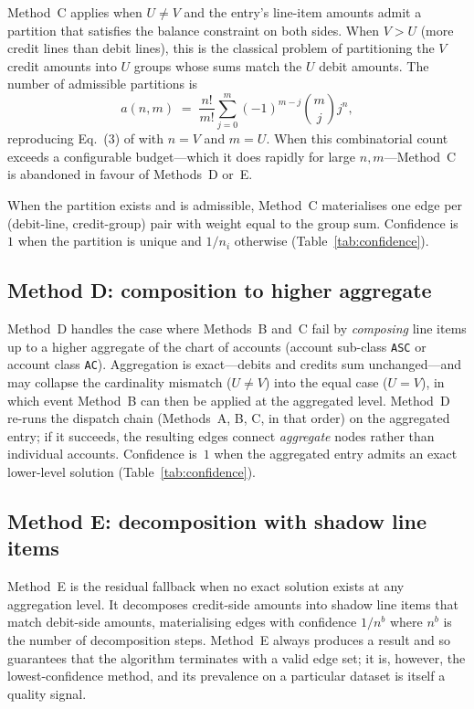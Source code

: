 Method~C applies when $U \neq V$ and the entry's line-item amounts
admit a partition that satisfies the balance constraint
on both sides.  When $V > U$ (more credit lines than debit
lines), this is the classical problem of partitioning the $V$
credit amounts into $U$ groups whose sums match the $U$ debit
amounts.  The number of admissible partitions is
\begin{equation}
  a(n, m) \;=\; \frac{n!}{m!} \sum_{j=0}^{m}
                (-1)^{m-j} \binom{m}{j} j^n, \label{eq:partition-count}
\end{equation}
reproducing Eq.~(3) of \citet{ivertowski2024apn} with $n = V$ and
$m = U$.  When this combinatorial count exceeds a configurable
budget---which it does rapidly for large $n, m$---Method~C is
abandoned in favour of Methods~D or~E.

When the partition exists and is admissible, Method~C materialises
one edge per (debit-line, credit-group) pair with weight equal to
the group sum.  Confidence is $1$ when the partition is unique and
$1/n_i$ otherwise (Table~\ref{tab:confidence}).

\subsection{Method D: composition to higher aggregate}
\label{sec:network:D}

Method~D handles the case where Methods~B and~C fail by
\emph{composing} line items up to a higher aggregate of the chart
of accounts (account sub-class \texttt{ASC} or account class
\texttt{AC}).  Aggregation is exact---debits and credits sum
unchanged---and may collapse the cardinality mismatch
($U \neq V$) into the equal case ($U = V$), in which event
Method~B can then be applied at the aggregated level.  Method~D
re-runs the dispatch chain (Methods~A, B, C, in that order) on the
aggregated entry; if it succeeds, the resulting edges connect
\emph{aggregate} nodes rather than individual accounts.  Confidence
is~$1$ when the aggregated entry admits an exact lower-level
solution (Table~\ref{tab:confidence}).

\subsection{Method E: decomposition with shadow line items}
\label{sec:network:E}

Method~E is the residual fallback when no exact solution exists at
any aggregation level.  It decomposes credit-side amounts into
shadow line items that match debit-side amounts, materialising
edges with confidence $1/n^b$ where $n^b$ is the number of
decomposition steps.  Method~E always produces a result and so
guarantees that the algorithm terminates with a valid edge set; it
is, however, the lowest-confidence method, and its prevalence on a
particular dataset is itself a quality signal.


